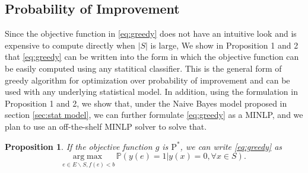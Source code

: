 \documentclass[12pt]{article}
\newcommand{\PI}{\text{P}^*}
\newtheorem{proposition}{Proposition}
\begin{document}
\subsection{Probability of Improvement}
Since the objective function in \eqref{eq:greedy} does not have an intuitive look and is expensive to compute directly when $|S|$ is large, We show in Proposition 1 and 2 that \eqref{eq:greedy} can be written into the form in which the objective function can be easily computed using any statitical classifier. This is the general form of greedy algorithm for optimization over probability of improvement and can be used with any underlying statistical model. In addition, using the formulation in Proposition 1 and 2, we show that, under the Naive Bayes model proposed in section \ref{sec:stat model}, we can further formulate \eqref{eq:greedy} as a MINLP, and we plan to use an off-the-shelf MINLP solver to solve that.
\begin{proposition}
  If the objective function $g$ is $\PI$, we can write \eqref{eq:greedy} as 
  \begin{equation} \label{eq:PI3}
    \underset{e \in E \backslash S, f(e)<b}{\mathrm{arg}\max} \, \mathbb{P}(y(e)=1|y(x)=0, \forall x \in S).
  \end{equation}
\end{proposition}
\end{document}
